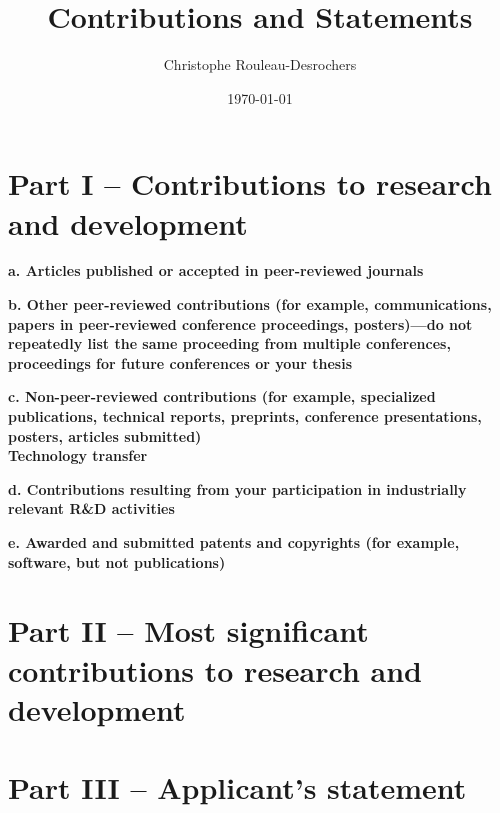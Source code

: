 \documentclass{article}
\title{Contributions and Statements}
\date{\today}
\author{Christophe Rouleau-Desrochers}
\begin{document}

\maketitle

\section*{Part I – Contributions to research and development}
\par
\textbf{a. Articles published or accepted in peer-reviewed journals} \\
\par
\textbf{b. Other peer-reviewed contributions (for example, communications, papers in peer-reviewed conference proceedings, posters)—do not repeatedly list the same proceeding from multiple conferences, proceedings for future conferences or your thesis} \\
\par
\textbf{c. Non-peer-reviewed contributions (for example, specialized publications, technical reports, preprints, conference presentations, posters, articles submitted) \\
Technology transfer} \\ 
\par
\textbf{d. Contributions resulting from your participation in industrially relevant R\&D activities} \\ 
\par
\textbf{e. Awarded and submitted patents and copyrights (for example, software, but not publications)}


\section*{Part II – Most significant contributions to research and development}

\section*{Part III – Applicant’s statement}
\end{document}
